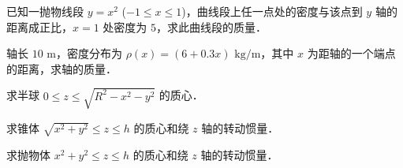 \begin{xiti}
\item 已知一抛物线段 $y = x^2$ ($-1 \leqslant x \leqslant 1$)，曲线段上任一点处的密度与该点到 $y$ 轴的距离成正比，$x = 1$ 处密度为 $5$，求此曲线段的质量．

\item 轴长 $10\text{ m}$，密度分布为 $\rho(x) = (6 + 0.3x)\text{ kg/m}$，其中 $x$ 为距轴的一个端点的距离，求轴的质量．

\item 求半球 $0 \leqslant z \leqslant \sqrt{R^2 - x^2 - y^2}$ 的质心．

\item 求锥体 $\sqrt{x^2 + y^2} \leqslant z \leqslant h$ 的质心和绕 $z$ 轴的转动惯量．

\item 求抛物体 $x^2 + y^2 \leqslant z \leqslant h$ 的质心和绕 $z$ 轴的转动惯量．
\end{xiti}
